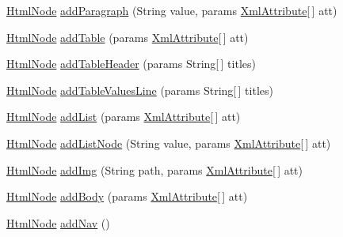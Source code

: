 \begin{DoxyCompactItemize}
\item 
\mbox{\hyperlink{class_n_t_k_1_1_i_o_1_1_html_1_1_html_node}{Html\+Node}} \mbox{\hyperlink{class_n_t_k_1_1_i_o_1_1_html_1_1_html_node_ad9f6ff93c1b9ba08233cb84dd6cd1cc2}{add\+Paragraph}} (String value, params \mbox{\hyperlink{class_n_t_k_1_1_i_o_1_1_xml_1_1_xml_attribute}{Xml\+Attribute}}\mbox{[}$\,$\mbox{]} att)
\item 
\mbox{\hyperlink{class_n_t_k_1_1_i_o_1_1_html_1_1_html_node}{Html\+Node}} \mbox{\hyperlink{class_n_t_k_1_1_i_o_1_1_html_1_1_html_node_ac104bfc46be493e285abbd554128645d}{add\+Table}} (params \mbox{\hyperlink{class_n_t_k_1_1_i_o_1_1_xml_1_1_xml_attribute}{Xml\+Attribute}}\mbox{[}$\,$\mbox{]} att)
\item 
\mbox{\hyperlink{class_n_t_k_1_1_i_o_1_1_html_1_1_html_node}{Html\+Node}} \mbox{\hyperlink{class_n_t_k_1_1_i_o_1_1_html_1_1_html_node_af37ec1d025a6094368faa24258e2b361}{add\+Table\+Header}} (params String\mbox{[}$\,$\mbox{]} titles)
\item 
\mbox{\hyperlink{class_n_t_k_1_1_i_o_1_1_html_1_1_html_node}{Html\+Node}} \mbox{\hyperlink{class_n_t_k_1_1_i_o_1_1_html_1_1_html_node_a6ada68a8305622cab2fe9fd391f44ddf}{add\+Table\+Values\+Line}} (params String\mbox{[}$\,$\mbox{]} titles)
\item 
\mbox{\hyperlink{class_n_t_k_1_1_i_o_1_1_html_1_1_html_node}{Html\+Node}} \mbox{\hyperlink{class_n_t_k_1_1_i_o_1_1_html_1_1_html_node_a12b693c220b0856c0045c493d870b20f}{add\+List}} (params \mbox{\hyperlink{class_n_t_k_1_1_i_o_1_1_xml_1_1_xml_attribute}{Xml\+Attribute}}\mbox{[}$\,$\mbox{]} att)
\item 
\mbox{\hyperlink{class_n_t_k_1_1_i_o_1_1_html_1_1_html_node}{Html\+Node}} \mbox{\hyperlink{class_n_t_k_1_1_i_o_1_1_html_1_1_html_node_ad101aaa81a43b5a0f4b2f4575f921822}{add\+List\+Node}} (String value, params \mbox{\hyperlink{class_n_t_k_1_1_i_o_1_1_xml_1_1_xml_attribute}{Xml\+Attribute}}\mbox{[}$\,$\mbox{]} att)
\item 
\mbox{\hyperlink{class_n_t_k_1_1_i_o_1_1_html_1_1_html_node}{Html\+Node}} \mbox{\hyperlink{class_n_t_k_1_1_i_o_1_1_html_1_1_html_node_a797c00333d4d4ba57626ffb91fbe8a60}{add\+Img}} (String path, params \mbox{\hyperlink{class_n_t_k_1_1_i_o_1_1_xml_1_1_xml_attribute}{Xml\+Attribute}}\mbox{[}$\,$\mbox{]} att)
\item 
\mbox{\hyperlink{class_n_t_k_1_1_i_o_1_1_html_1_1_html_node}{Html\+Node}} \mbox{\hyperlink{class_n_t_k_1_1_i_o_1_1_html_1_1_html_node_a2c6cf724faec17eac0c5edcdd8348eb7}{add\+Body}} (params \mbox{\hyperlink{class_n_t_k_1_1_i_o_1_1_xml_1_1_xml_attribute}{Xml\+Attribute}}\mbox{[}$\,$\mbox{]} att)
\item 
\mbox{\hyperlink{class_n_t_k_1_1_i_o_1_1_html_1_1_html_node}{Html\+Node}} \mbox{\hyperlink{class_n_t_k_1_1_i_o_1_1_html_1_1_html_node_ab64214421a7afcdd6ea7a5a31ad4ed05}{add\+Nav}} ()
\end{DoxyCompactItemize}
